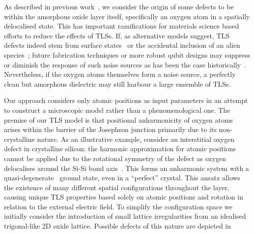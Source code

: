 As described in previous work~\cite{DuBois2013}, we consider the origin of some defects to be within the amorphous oxide layer itself, specifically an oxygen atom in a spatially delocalised state.
This has important ramifications for materials science based efforts to reduce the effects of TLSs.
If, as alternative models suggest, TLS defects indeed stem from surface states~\cite{Choi2009} or the accidental inclusion of an alien species~\cite{Jameson2011, Holder2013}; future fabrication techniques or more robust qubit designs may suppress or diminish the response of such noise sources as has been the case historically~\cite{Vion2002, Martinis2005, Koch2007, Schreier2008, Houck2008}.
Nevertheless, if the oxygen atoms themselves form a noise source, a perfectly clean but amorphous dielectric may still harbour a large ensemble of TLSs.

Our approach considers only atomic positions as input parameters in an attempt to construct a microscopic model rather than a phenomenological one.
The premise of our TLS model is that positional anharmonicity of oxygen atoms arises within the  barrier of the Josephson junction primarily due to its non-crystalline nature. As an illustrative example, consider an interstitial oxygen defect in crystalline silicon: the harmonic approximation for atomic positions cannot be applied due to the rotational symmetry of the defect as oxygen delocalises around the Si-Si bond axis~\cite{Artacho1995}.
This forms an anharmonic system with a quasi-degenerate~\cite{DuBois2013} ground state, even in a ``perfect'' crystal.
This ansatz allows the existence of many different spatial configurations throughout the layer, causing unique TLS properties based solely on atomic positions and rotation in relation to the external electric field.
To simplify the configuration space we initially consider the introduction of small lattice irregularities from an idealised trigonal-like 2D oxide lattice.
Possible defects of this nature are depicted in %


